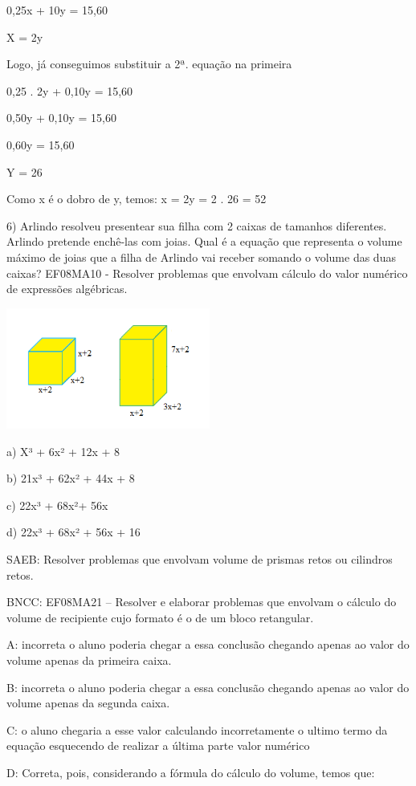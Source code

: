 0,25x + 10y = 15,60

X = 2y

Logo, já conseguimos substituir a 2ª. equação na primeira

0,25 . 2y + 0,10y = 15,60

0,50y + 0,10y = 15,60

0,60y = 15,60

Y = 26

Como x é o dobro de y, temos: x = 2y = 2 . 26 = 52

6) Arlindo resolveu presentear sua filha com 2 caixas de tamanhos
diferentes. Arlindo pretende enchê-las com joias. Qual é a equação que
representa o volume máximo de joias que a filha de Arlindo vai receber
somando o volume das duas caixas? EF08MA10 - Resolver problemas que
envolvam cálculo do valor numérico de expressões algébricas.

\includegraphics[width=2.63333in,height=1.56545in]{./imgSAEB_8_MAT/media/image55.png}

a) X³ + 6x² + 12x + 8

b) 21x³ + 62x² + 44x + 8

c) 22x³ + 68x²+ 56x

d) 22x³ + 68x² + 56x + 16

SAEB: Resolver problemas que envolvam volume de prismas retos ou
cilindros retos.

BNCC: EF08MA21 -- Resolver e elaborar problemas que envolvam o cálculo
do volume de recipiente cujo formato é o de um bloco retangular.

A: incorreta o aluno poderia chegar a essa conclusão chegando apenas ao
valor do volume apenas da primeira caixa.

B: incorreta o aluno poderia chegar a essa conclusão chegando apenas ao
valor do volume apenas da segunda caixa.

C: o aluno chegaria a esse valor calculando incorretamente o ultimo
termo da equação esquecendo de realizar a última parte valor numérico

D: Correta, pois, considerando a fórmula do cálculo do volume, temos
que:

